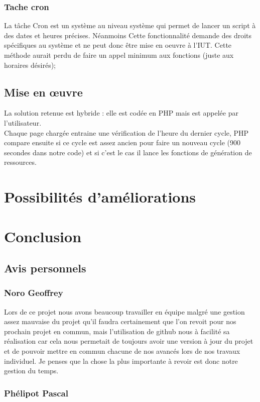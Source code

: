\documentclass[11pt,a4paper]{article}
\begin{document}
\subsubsection{Tache cron}
La tâche Cron est un système au niveau système qui permet de lancer un script à des dates et heures précises. Néanmoins Cette fonctionnalité demande des droits spécifiques au système et ne peut donc être mise en oeuvre à l'IUT. Cette méthode aurait perdu de faire un appel minimum aux fonctions (juste aux horaires désirés);
\subsection{Mise en œuvre}
La solution retenue est hybride : elle est codée en PHP mais est appelée par l'utilisateur. \\
Chaque page chargée entraine une vérification de l'heure du dernier cycle, PHP compare ensuite si ce cycle est assez ancien pour faire un nouveau cycle (900 secondes dans notre code) et si c'est le cas il lance les fonctions de génération de ressources.

\newpage\section{Possibilités d'améliorations}

\newpage\section{Conclusion}
\subsection{Avis personnels}
\subsubsection{Noro Geoffrey}
Lors de ce projet nous avons beaucoup travailler en équipe malgré une gestion assez mauvaise du projet qu'il faudra certainement que l'on revoit pour nos prochain projet en commun, mais l'utilisation de github nous à facilité sa réalisation car cela nous permetait de toujours avoir une version à jour du projet et de pouvoir mettre en commun chacune de nos avancés lors de nos travaux individuel. Je penses que la chose la plus importante à revoir est donc notre gestion du temps.
\subsubsection{Phélipot Pascal}
\end{document}
